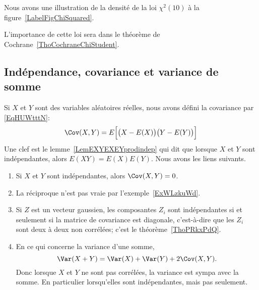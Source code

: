 Nous avons une illustration de la densité de la loi \( \chi^2(10)\) à la figure~\ref{LabelFigChiSquared}.
\newcommand{\CaptionFigChiSquared}{La densité de \( \chi^2(10)\).}


L'importance de cette loi sera dans le théorème de Cochrane~\ref{ThoCochraneChiStudent}.

\subsection{Indépendance, covariance et variance de somme}
\label{subsecTTHohur}

Si \( X\) et \( Y\) sont des variables aléatoires réelles, nous avons défini la covariance par \eqref{EqHUWtttN}:
\begin{equation}
	\Cov(X,Y)=E\Big[ \big( X-E(X) \big)\big( Y-E(Y) \big) \Big]
\end{equation}
Une clef est le lemme~\ref{LemEXYEXEYprodindep} qui dit que lorsque \( X\) et \( Y\) sont indépendantes, alors \( E(XY)=E(X)E(Y)\). Nous avons les liens suivants.
\begin{enumerate}
	\item
	      Si \( X\) et \( Y\) sont indépendantes, alors \( \Cov(X,Y)=0\).
	\item
	      La réciproque n'est pas vraie par l'exemple~\ref{ExWLzkuWd}.
	\item
	      Si \( Z\) est un vecteur gaussien, les composantes \( Z_i\) sont indépendantes si et seulement si la matrice de covariance est diagonale, c'est-à-dire que les \( Z_i\) sont deux à deux non corrélées; c'est le théorème~\ref{ThoPRkxPdQ}.
	\item
	      En ce qui concerne la variance d'une somme,
	      \begin{equation}
		      \Var(X+Y)=\Var(X)+\Var(Y)+2\Cov(X,Y).
	      \end{equation}
	      Donc lorsque \( X\) et \( Y\) ne sont pas corrélées, la variance est sympa avec la somme. En particulier lorsqu'elles sont indépendantes, mais pas seulement.
\end{enumerate}


